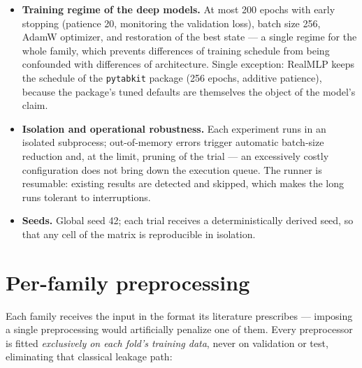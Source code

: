 \begin{itemize}
    architectures had 4$\times$ the budget of KAN/TabKAN; the
    dataset is excluded from the tuning-cost aggregates, and the
    direction of the bias (in favor of the legacy models, which
    still do not beat the GBDTs there) touches no conclusion. The
    GBDTs use internal early stopping (50 rounds on a validation
    set), symmetric in spirit to the deep models' stopping. The
    per-model search spaces are in
    Appendix~\ref{app:espacos-busca}, and the values actually chosen
    per dataset in Appendix~\ref{app:hp-escolhidos} --- some touch
    the edge of the space (e.g., \texttt{n\_estimators} close to the
    2{,}000 cap), a declared limitation of the space design. The
    optimization direction follows each task's primary metric
    (maximizing ROC-AUC; minimizing log-loss and RMSE;
    Section~\ref{sec:met-metricas}).
  \item \textbf{Training regime of the deep models.} At most 200
    epochs with early stopping (patience 20, monitoring the
    validation loss), batch size 256, AdamW optimizer, and
    restoration of the best state --- a single regime for the whole
    family, which prevents differences of training schedule from
    being confounded with differences of architecture. Single
    exception: RealMLP keeps the schedule of the \texttt{pytabkit}
    package (256 epochs, additive patience), because the package's
    tuned defaults are themselves the object of the model's claim.
  \item \textbf{Isolation and operational robustness.} Each
    experiment runs in an isolated subprocess; out-of-memory errors
    trigger automatic batch-size reduction and, at the limit,
    pruning of the trial --- an excessively costly configuration
    does not bring down the execution queue. The runner is
    resumable: existing results are detected and skipped, which
    makes the long runs tolerant to interruptions.
  \item \textbf{Seeds.} Global seed 42; each trial receives a
    deterministically derived seed, so that any cell of the matrix
    is reproducible in isolation.
\end{itemize}

\section{Per-family preprocessing}
\label{sec:met-preproc}

Each family receives the input in the format its literature
prescribes --- imposing a single preprocessing would artificially
penalize one of them. Every preprocessor is fitted \emph{exclusively
on each fold's training data}, never on validation or test,
eliminating that classical leakage path:

